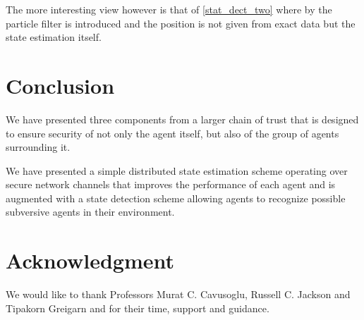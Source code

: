 \documentclass[conference]{IEEEtran}
\begin{document}
The more interesting view however is that of \autoref{stat_dect_two} where by the particle filter is introduced and the position is not given from exact data but the state estimation itself.


\section{Conclusion} \label{Conclusion}
We have presented three components from a larger chain of trust that is designed to ensure security of not only the agent itself, but also of the group of agents surrounding it.

We have presented a simple distributed state estimation scheme operating over secure network channels that improves the performance of each agent and is augmented with a state detection scheme allowing agents to recognize possible subversive agents in their environment.

\section*{Acknowledgment}
We would like to thank Professors Murat C. Cavusoglu, Russell C. Jackson and Tipakorn Greigarn and for their time, support and guidance.

\printbibliography
\end{document}
